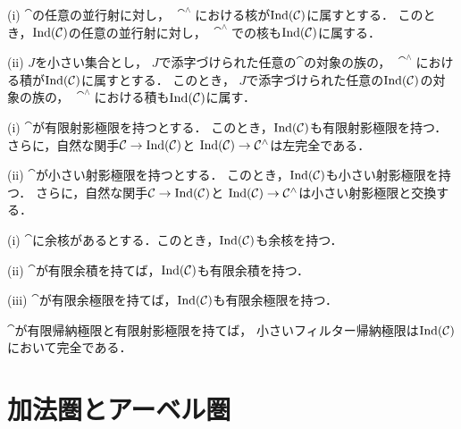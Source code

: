\begin{Proposition}\label{prop:ind-lim}
    (i) 
    $\cat$の任意の並行射に対し，
    $\cat^\wedge$における核が$\mathop{\mathrm{Ind}}(\mathcal{C})$に属すとする．
    このとき，$\mathop{\mathrm{Ind}}(\mathcal{C})$の任意の並行射に対し，
    $\cat^\wedge$での核も$\mathop{\mathrm{Ind}}(\mathcal{C})$に属する．

    (ii) 
    $J$を小さい集合とし，
    $J$で添字づけられた任意の$\cat$の対象の族の，
    $\cat^\wedge$における積が$\mathop{\mathrm{Ind}}(\mathcal{C})$に属すとする．
    このとき，
    $J$で添字づけられた任意の$\mathop{\mathrm{Ind}}(\mathcal{C})$の対象の族の，
    $\cat^\wedge$における積も$\mathop{\mathrm{Ind}}(\mathcal{C})$に属す．
\end{Proposition}

\begin{Corollary}\label{cor:ind-comm-proj}
    (i) 
    $\cat$が有限射影極限を持つとする．
    このとき，$\mathop{\mathrm{Ind}}(\mathcal{C})$も有限射影極限を持つ．
    さらに，自然な関手$\mathcal{C}\to\mathop{\mathrm{Ind}}(\mathcal{C})$と
    $\mathop{\mathrm{Ind}}(\mathcal{C})\to\mathcal{C}^\wedge$は左完全である．

    (ii) 
    $\cat$が小さい射影極限を持つとする．
    このとき，$\mathop{\mathrm{Ind}}(\mathcal{C})$も小さい射影極限を持つ．
    さらに，自然な関手$\mathcal{C}\to\mathop{\mathrm{Ind}}(\mathcal{C})$と
    $\mathop{\mathrm{Ind}}(\mathcal{C})\to\mathcal{C}^\wedge$は小さい射影極限と交換する．
\end{Corollary}








\begin{Proposition}\label{prop:ind-fin-colim}
    (i) 
    $\cat$に余核があるとする．このとき，$\mathop{\mathrm{Ind}}(\mathcal{C})$も余核を持つ．

    (ii) 
    $\cat$が有限余積を持てば，$\mathop{\mathrm{Ind}}(\mathcal{C})$も有限余積を持つ．

    (iii) 
    $\cat$が有限余極限を持てば，$\mathop{\mathrm{Ind}}(\mathcal{C})$も有限余極限を持つ．
\end{Proposition}

\begin{Proposition}\label{prop:ind-filtrant}
    $\cat$が有限帰納極限と有限射影極限を持てば，
    小さいフィルター帰納極限は$\mathop{\mathrm{Ind}}(\mathcal{C})$において完全である．
\end{Proposition}












\section{加法圏とアーベル圏}

